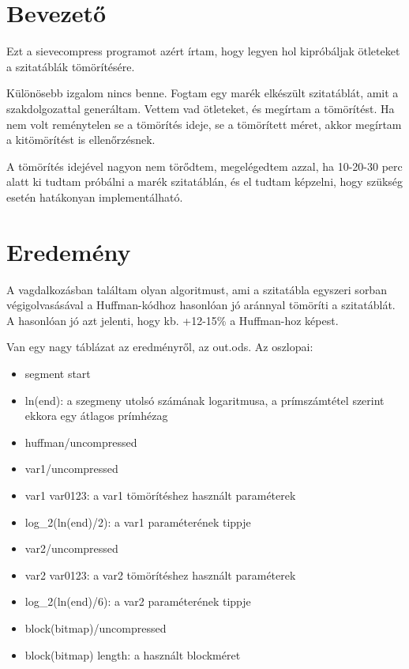 \documentclass{article}
\begin{document}
\tableofcontents

\section{Bevezető}

Ezt a sievecompress  programot azért írtam, hogy legyen hol kipróbáljak ötleteket a szitatáblák tömörítésére.

Különösebb izgalom nincs benne. Fogtam egy marék elkészült szitatáblát, amit a szakdolgozattal generáltam. Vettem vad ötleteket, és megírtam a tömörítést. Ha nem volt reménytelen se a tömörítés ideje, se a tömörített méret, akkor megírtam a kitömörítést is ellenőrzésnek.

A tömörítés idejével nagyon nem törődtem, megelégedtem azzal, ha 10-20-30 perc alatt ki tudtam próbálni a marék szitatáblán, és el tudtam képzelni, hogy szükség esetén hatákonyan implementálható.

\section{Eredemény}

A vagdalkozásban találtam olyan algoritmust, ami a szitatábla egyszeri sorban végigolvasásával a Huffman-kódhoz hasonlóan jó aránnyal tömöríti a szitatáblát. A hasonlóan jó azt jelenti, hogy kb. +12-15\% a Huffman-hoz képest.

Van egy nagy táblázat az eredményről, az out.ods. Az oszlopai:
\begin{itemize}
\item segment start
\item ln(end): a szegmeny utolsó számának logaritmusa, a prímszámtétel szerint ekkora egy átlagos prímhézag
\item huffman/uncompressed
\item var1/uncompressed
\item var1 var0123: a var1 tömörítéshez használt paraméterek
\item log\_2(ln(end)/2): a var1 paraméterének tippje
\item var2/uncompressed
\item var2 var0123: a var2 tömörítéshez használt paraméterek
\item log\_2(ln(end)/6): a var2 paraméterének tippje
\item block(bitmap)/uncompressed
\item block(bitmap) length: a használt blockméret
\end{itemize}
\end{document}
